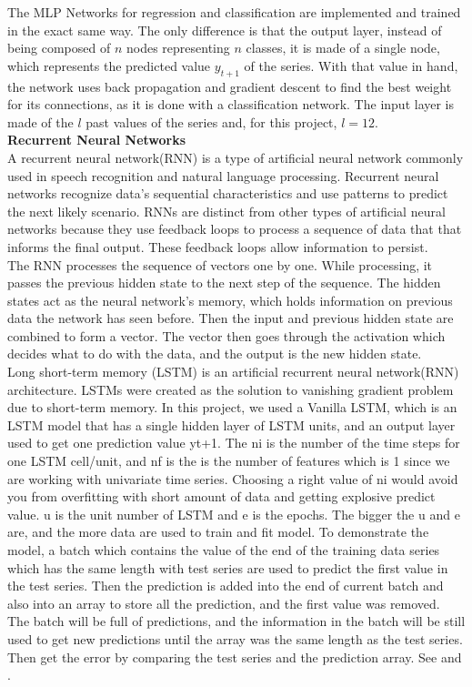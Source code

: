\documentclass[10pt,twocolumn,letterpaper]{article}
\begin{document}
	The MLP Networks for regression and classification are implemented and trained in the exact same way. The only difference is that the output layer, instead of being composed of $n$ nodes representing $n$ classes, it is made of a single node, which represents the predicted value $y_{t+1}$ of the series. With that value in hand, the network uses back propagation and gradient descent to find the best weight for its connections, as it is done with a classification network. The input layer is made of the $l$ past values of the series and, for this project, $l=12$.\\
	
	\textbf{Recurrent Neural Networks}\\
	
A recurrent neural network(RNN) is a type of artificial neural network commonly used in speech recognition and natural language processing. Recurrent neural networks recognize data's sequential characteristics and use patterns to predict the next likely scenario. RNNs are distinct from other types of artificial neural networks because they use feedback loops to process a sequence of data that that informs the final output. These feedback loops allow information to persist. \\

The RNN processes the sequence of vectors one by one. While processing, it passes the previous hidden state to the next step of the sequence. The hidden states act as the neural network’s memory, which holds information on previous data the network has seen before. Then the input and previous hidden state are combined to form a vector. The vector then goes through the activation which decides what to do with the data, and the output is the new hidden state.\\

Long short-term memory (LSTM) is an artificial recurrent neural network(RNN) architecture. LSTMs were created as the solution to vanishing gradient problem due to short-term memory. In this project, we used a Vanilla LSTM, which is an LSTM model that has a single hidden layer of LSTM units, and an output layer used to get one prediction value yt+1. The ni is the number of the time steps for one LSTM cell/unit, and nf is the is the number of features which is 1 since we are working with univariate time series. Choosing a right value of ni would avoid you from overfitting with short amount of data and getting explosive predict value. u is the unit number of LSTM and e is the epochs. The bigger the u and e are, and the more data are used to train and fit model. To demonstrate the model, a batch which contains the value of the end of the training data series which has the same length with test series are used to predict the first value in the test series. Then the prediction is added into the end of current batch and also into an array to store all the prediction, and the first value was removed. The batch will be full of predictions, and the information in the batch will be still used to get new predictions until the array was the same length as the test series. Then get the error by comparing the test series and the prediction array. See\cite{abiodun2018state} and \cite{hochreiter1997long}.\\
\end{document}
